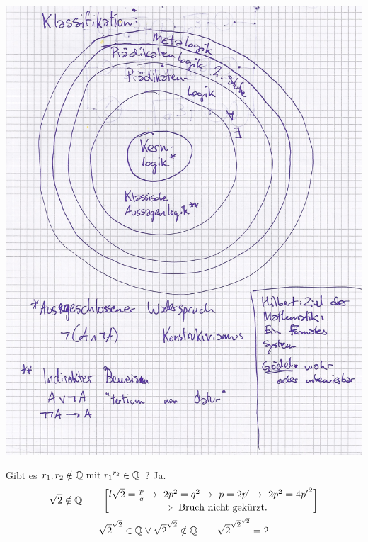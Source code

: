 \includegraphics[width=\textwidth]{Bild6} \\
\begin{bsp*}
	Gibt es $r_1 , r_2 \notin \mathbb{Q} \text{ mit } {r_1}^{r_2} \in \mathbb{Q}$ ? Ja.
	\begin{gather*}
		\sqrt{2} \notin \Q \qquad
		\begin{bmatrix*}{l}
			\sqrt{2} = \frac{p}{q} \rightarrow 2p^2 = q^2 \rightarrow p = 2p' \rightarrow 2p^2 = 4{p'}^2 \\
			\implies \text{Bruch nicht gekürzt.}
		\end{bmatrix*} \\
		{\sqrt{2}}^{\sqrt{2}} \in \Q \vee {\sqrt{2}}^{\sqrt{2}} \notin \Q \qquad \sqrt{2}^{{\sqrt{2}}^{\sqrt{2}}} = 2
	\end{gather*}
\end{bsp*}
